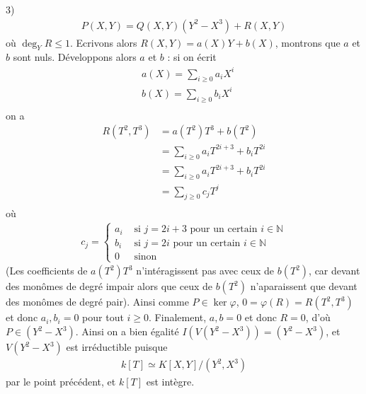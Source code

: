 \documentclass[11pt]{article}
\begin{document}
\begin{question}{3)}
        \begin{align*}
            P(X,Y) = Q(X,Y)(Y^2 - X^3) + R(X,Y)
        \end{align*}
        où $\deg_Y R \leq 1$. Ecrivons alors $R(X,Y) = a(X)Y + b(X)$, montrons que $a$ et $b$ sont nuls. Développons alors $a$ et $b$ : si on écrit 
        \begin{align*}
            &a(X) = \sum_{i \geq 0} a_i X^i \\
            &b(X) = \sum_{i \geq 0} b_i X^i \\
        \end{align*}
        on a 
        \begin{align*}
            R(T^2, T^3) &= a(T^2)T^3 + b(T^2) \\
            &= \sum_{i \geq 0} a_i T^{2i + 3} + b_i T^{2i} \\
            &= \sum_{i \geq 0} a_i T^{2i + 3} + b_i T^{2i} \\
            &= \sum_{j \geq 0} c_j T^j \\
        \end{align*}
        où
        \begin{align*}
            c_j =
            \begin{cases}
                a_i &\text{ si } j = 2i + 3 \text{ pour un certain } i \in \mathbb{N} \\
                b_i &\text{ si } j = 2i \text{ pour un certain } i \in \mathbb{N} \\
                0 & \text{ sinon}
            \end{cases}
        \end{align*}
        (Les coefficients de $a(T^2)T^3$ n'intéragissent pas avec ceux de $b(T^2)$, car devant des monômes de degré impair alors que ceux de $b(T^2)$ n'aparaissent que devant des monômes de degré pair). Ainsi comme $P \in \ker \varphi$, $0 = \varphi(R) = R(T^2, T^3)$ et donc $a_i, b_i = 0$ pour tout $i \geq 0$. Finalement, $a,b = 0$ et donc $R = 0$, d'où $P \in (Y^2 - X^3)$. Ainsi on a bien égalité $I(V(Y^2 - X^3)) = (Y^2 - X^3)$, et $V(Y^2 - X^3)$ est irréductible puisque
        \begin{align*}
            k[T] \simeq K[X,Y]/(Y^2 , X^3)
        \end{align*}
        par le point précédent, et $k[T]$ est intègre.
    \end{question}
\end{document}
